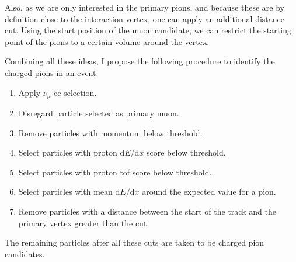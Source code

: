 Also, as we are only interested in the primary pions, and because these are by definition close to the interaction vertex, one can apply an additional distance cut. Using the start position of the muon candidate, we can restrict the starting point of the pions to a certain volume around the vertex.

Combining all these ideas, I propose the following procedure to identify the charged pions in an event:
\begin{enumerate}
    \item Apply $\nu_{\mu}$ \gls{cc} selection.
    \item Disregard particle selected as primary muon.
    \item Remove particles with momentum below threshold.
    \item Select particles with proton $\mathrm{d}E/\mathrm{d}x$ score below threshold.
    \item Select particles with proton \gls{tof} score below threshold.
    \item Select particles with mean $\mathrm{d}E/\mathrm{d}x$ around the expected value for a pion.
    \item Remove particles with a distance between the start of the track and the primary vertex greater than the cut.
\end{enumerate}
The remaining particles after all these cuts are taken to be charged pion candidates.

